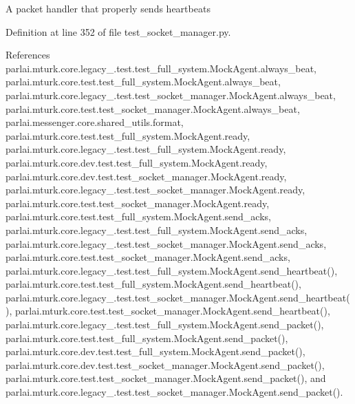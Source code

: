 \begin{DoxyVerb}A packet handler that properly sends heartbeats\end{DoxyVerb}
 

Definition at line 352 of file test\+\_\+socket\+\_\+manager.\+py.



References parlai.\+mturk.\+core.\+legacy\+\_.\+test.\+test\+\_\+full\+\_\+system.\+Mock\+Agent.\+always\+\_\+beat, parlai.\+mturk.\+core.\+test.\+test\+\_\+full\+\_\+system.\+Mock\+Agent.\+always\+\_\+beat, parlai.\+mturk.\+core.\+legacy\+\_.\+test.\+test\+\_\+socket\+\_\+manager.\+Mock\+Agent.\+always\+\_\+beat, parlai.\+mturk.\+core.\+test.\+test\+\_\+socket\+\_\+manager.\+Mock\+Agent.\+always\+\_\+beat, parlai.\+messenger.\+core.\+shared\+\_\+utils.\+format, parlai.\+mturk.\+core.\+test.\+test\+\_\+full\+\_\+system.\+Mock\+Agent.\+ready, parlai.\+mturk.\+core.\+legacy\+\_.\+test.\+test\+\_\+full\+\_\+system.\+Mock\+Agent.\+ready, parlai.\+mturk.\+core.\+dev.\+test.\+test\+\_\+full\+\_\+system.\+Mock\+Agent.\+ready, parlai.\+mturk.\+core.\+dev.\+test.\+test\+\_\+socket\+\_\+manager.\+Mock\+Agent.\+ready, parlai.\+mturk.\+core.\+legacy\+\_.\+test.\+test\+\_\+socket\+\_\+manager.\+Mock\+Agent.\+ready, parlai.\+mturk.\+core.\+test.\+test\+\_\+socket\+\_\+manager.\+Mock\+Agent.\+ready, parlai.\+mturk.\+core.\+test.\+test\+\_\+full\+\_\+system.\+Mock\+Agent.\+send\+\_\+acks, parlai.\+mturk.\+core.\+legacy\+\_.\+test.\+test\+\_\+full\+\_\+system.\+Mock\+Agent.\+send\+\_\+acks, parlai.\+mturk.\+core.\+legacy\+\_.\+test.\+test\+\_\+socket\+\_\+manager.\+Mock\+Agent.\+send\+\_\+acks, parlai.\+mturk.\+core.\+test.\+test\+\_\+socket\+\_\+manager.\+Mock\+Agent.\+send\+\_\+acks, parlai.\+mturk.\+core.\+legacy\+\_.\+test.\+test\+\_\+full\+\_\+system.\+Mock\+Agent.\+send\+\_\+heartbeat(), parlai.\+mturk.\+core.\+test.\+test\+\_\+full\+\_\+system.\+Mock\+Agent.\+send\+\_\+heartbeat(), parlai.\+mturk.\+core.\+legacy\+\_.\+test.\+test\+\_\+socket\+\_\+manager.\+Mock\+Agent.\+send\+\_\+heartbeat(), parlai.\+mturk.\+core.\+test.\+test\+\_\+socket\+\_\+manager.\+Mock\+Agent.\+send\+\_\+heartbeat(), parlai.\+mturk.\+core.\+legacy\+\_.\+test.\+test\+\_\+full\+\_\+system.\+Mock\+Agent.\+send\+\_\+packet(), parlai.\+mturk.\+core.\+test.\+test\+\_\+full\+\_\+system.\+Mock\+Agent.\+send\+\_\+packet(), parlai.\+mturk.\+core.\+dev.\+test.\+test\+\_\+full\+\_\+system.\+Mock\+Agent.\+send\+\_\+packet(), parlai.\+mturk.\+core.\+dev.\+test.\+test\+\_\+socket\+\_\+manager.\+Mock\+Agent.\+send\+\_\+packet(), parlai.\+mturk.\+core.\+test.\+test\+\_\+socket\+\_\+manager.\+Mock\+Agent.\+send\+\_\+packet(), and parlai.\+mturk.\+core.\+legacy\+\_.\+test.\+test\+\_\+socket\+\_\+manager.\+Mock\+Agent.\+send\+\_\+packet().



